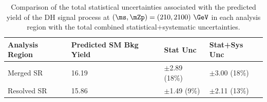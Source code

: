 \begin{table}[ht]
\begin{center}
\caption{\label{tab:rel_impacts_sig} Comparison of the total statistical uncertainties associated with the predicted yield of the DH signal process at \((\ms, \mZp)=(210, 2100)~\GeV\) in each analysis region with the total combined statistical+systematic uncertainties.}
\begin{tabular}{l l l l }
\toprule
\textbf{Analysis Region}& \textbf{Predicted SM Bkg Yield} & \textbf{Stat Unc} & \textbf{Stat+Sys Unc} \tabularnewline
\midrule
\midrule
Merged SR & 16.19 & \(\pm\)2.89 (18\%) & \(\pm\)3.00 (18\%) \tabularnewline
\midrule
Resolved SR & 15.86 & \(\pm\)1.49 (9\%) & \(\pm\)2.11 (13\%) \tabularnewline
\bottomrule
\end{tabular}
\end{center}
\end{table}

